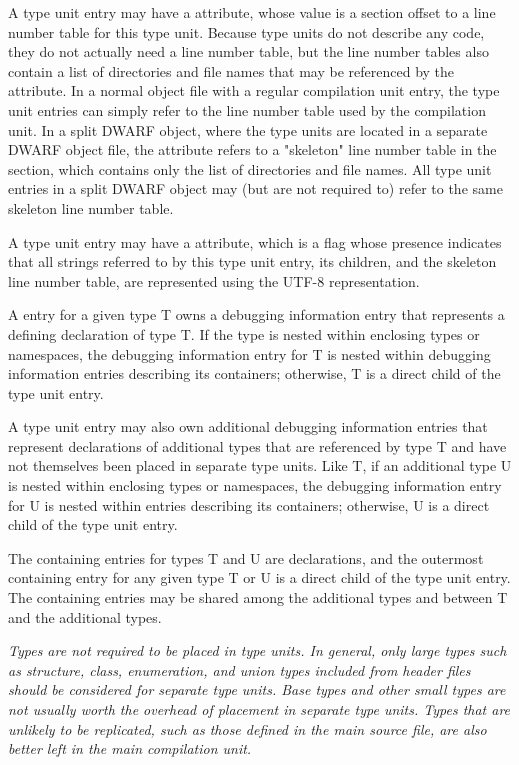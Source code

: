 A type unit entry may have a \DWATstmtlist{} attribute, whose
value is a section offset to a line number table for this
type unit. Because type units do not describe any code, they
do not actually need a line number table, but the line number
tables also contain a list of directories and file names that
may be referenced by the \DWATdeclfile{} attribute. In a
normal object file with a regular compilation unit entry, the
type unit entries can simply refer to the line number table
used by the compilation unit. In a split DWARF object, where
the type units are located in a separate DWARF object file,
the \DWATstmtlist{} attribute refers to a "skeleton"
line number table in the \dotdebuglinedwo{} section, which
contains only the list of directories and file names. All
type unit entries in a split DWARF object may (but are not
required to) refer to the same skeleton line number table.

A type unit entry may have a \DWATuseUTFeight{} attribute, which is a flag
whose presence indicates that all strings referred to by this type
unit entry, its children, and the skeleton line number table, are
represented using the UTF-8 representation.

A  entry for a given type T owns a debugging
information entry that represents a defining declaration
of type T. If the type is nested within enclosing types or
namespaces, the debugging information entry for T is nested
within debugging information entries describing its containers;
otherwise, T is a direct child of the type unit entry.

A type unit entry may also own additional debugging information
entries that represent declarations of additional types that
are referenced by type T and have not themselves been placed in
separate type units. Like T, if an additional type U is nested
within enclosing types or namespaces, the debugging information
entry for U is nested within entries describing its containers;
otherwise, U is a direct child of the type unit entry.

The containing entries for types T and U are declarations,
and the outermost containing entry for any given type T or
U is a direct child of the type unit entry. The containing
entries may be shared among the additional types and between
T and the additional types.

\textit{Types are not required to be placed in type units. In general,
only large types such as structure, class, enumeration, and
union types included from header files should be considered
for separate type units. Base types and other small types
are not usually worth the overhead of placement in separate
type units. Types that are unlikely to be replicated, such
as those defined in the main source file, are also better
left in the main compilation unit.}


